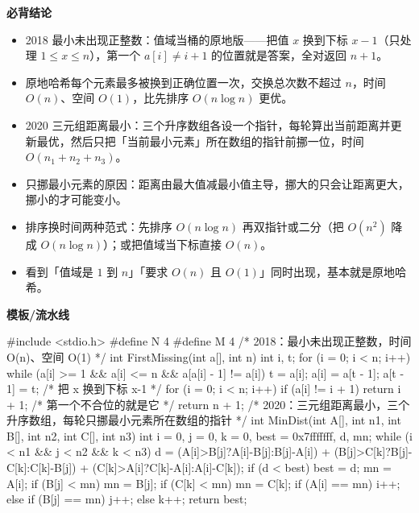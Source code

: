 \documentclass[10pt,a4paper]{ctexart}
\begin{document}




\textbf{必背结论}

\begin{itemize}

\item 2018 最小未出现正整数：值域当桶的原地版——把值 $x$ 换到下标 $x-1$（只处理 $1\le x\le n$），第一个 $a[i]\ne i+1$ 的位置就是答案，全对返回 $n+1$。

\item 原地哈希每个元素最多被换到正确位置一次，交换总次数不超过 $n$，时间 $O(n)$、空间 $O(1)$，比先排序 $O(n\log n)$ 更优。

\item 2020 三元组距离最小：三个升序数组各设一个指针，每轮算出当前距离并更新最优，然后只把「当前最小元素」所在数组的指针前挪一位，时间 $O(n_1+n_2+n_3)$。

\item 只挪最小元素的原因：距离由最大值减最小值主导，挪大的只会让距离更大，挪小的才可能变小。

\item 排序换时间两种范式：先排序 $O(n\log n)$ 再双指针或二分（把 $O(n^2)$ 降成 $O(n\log n)$）；或把值域当下标直接 $O(n)$。

\item 看到「值域是 $1$ 到 $n$」「要求 $O(n)$ 且 $O(1)$」同时出现，基本就是原地哈希。

\end{itemize}

\textbf{模板/流水线}

\begin{codebox}
#include <stdio.h>
#define N 4
#define M 4
/* 2018：最小未出现正整数，时间 O(n)、空间 O(1) */
int FirstMissing(int a[], int n) {
    int i, t;
    for (i = 0; i < n; i++)
        while (a[i] >= 1 && a[i] <= n && a[a[i] - 1] != a[i]) {
            t = a[i]; a[i] = a[t - 1]; a[t - 1] = t;   /* 把 x 换到下标 x-1 */
        }
    for (i = 0; i < n; i++)
        if (a[i] != i + 1) return i + 1;                /* 第一个不合位的就是它 */
    return n + 1;
}
/* 2020：三元组距离最小，三个升序数组，每轮只挪最小元素所在数组的指针 */
int MinDist(int A[], int n1, int B[], int n2, int C[], int n3) {
    int i = 0, j = 0, k = 0, best = 0x7fffffff, d, mn;
    while (i < n1 && j < n2 && k < n3) {
        d = (A[i]>B[j]?A[i]-B[j]:B[j]-A[i]) + (B[j]>C[k]?B[j]-C[k]:C[k]-B[j])
          + (C[k]>A[i]?C[k]-A[i]:A[i]-C[k]);
        if (d < best) best = d;
        mn = A[i]; if (B[j] < mn) mn = B[j]; if (C[k] < mn) mn = C[k];
        if (A[i] == mn) i++; else if (B[j] == mn) j++; else k++;
    }
    return best;
}
\end{codebox}
\end{document}
